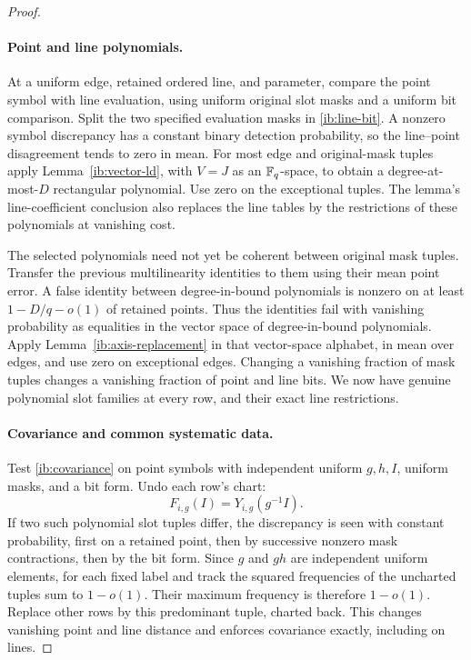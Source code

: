 \begin{proof}
\paragraph{Point and line polynomials.}
At a uniform edge, retained ordered line, and parameter, compare the
point symbol with line evaluation, using uniform original slot masks
and a uniform bit comparison.  Split the two specified evaluation
masks in \eqref{ib:line-bit}.  A nonzero symbol discrepancy has a
constant binary detection probability, so the line--point
disagreement tends to zero in mean.  For most edge and original-mask
tuples apply Lemma~\ref{ib:vector-ld}, with \(V=J\) as an
\(\mathbb{F}_q\)-space, to obtain a degree-at-most-\(D\) rectangular
polynomial.  Use zero on the exceptional tuples.  The lemma's
line-coefficient conclusion also replaces the line tables by the
restrictions of these polynomials at vanishing cost.

The selected polynomials need not yet be coherent between original
mask tuples.  Transfer the previous multilinearity identities to
them using their mean point error.  A false identity between
degree-in-bound polynomials is nonzero on at least
\(1-D/q-o(1)\) of retained points.  Thus the identities fail with
vanishing probability as equalities in the vector space of
degree-in-bound polynomials.  Apply
Lemma~\ref{ib:axis-replacement} in that vector-space alphabet, in
mean over edges, and use zero on exceptional edges.  Changing a
vanishing fraction of mask tuples changes a vanishing fraction of
point and line bits.  We now have genuine polynomial slot families
at every row, and their exact line restrictions.

\paragraph{Covariance and common systematic data.}
Test \eqref{ib:covariance} on point symbols with independent uniform
\(g,h,I\), uniform masks, and a bit form.  Undo each row's chart:
\[
 F_{i,g}(I)=Y_{i,g}(g^{-1}I).
\]
If two such polynomial slot tuples differ, the discrepancy is seen
with constant probability, first on a retained point, then by
successive nonzero mask contractions, then by the bit form.  Since
\(g\) and \(gh\) are independent uniform elements, for each fixed
label and track the squared frequencies of the uncharted tuples
sum to \(1-o(1)\).  Their maximum frequency is therefore
\(1-o(1)\).  Replace other rows by this predominant tuple, charted
back.  This changes vanishing point and line distance and enforces
covariance exactly, including on lines.


\end{proof}
